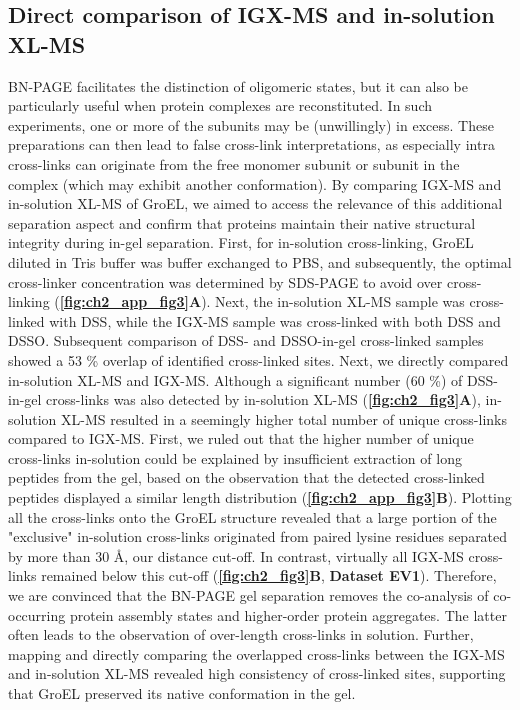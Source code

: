 \subsection*{Direct comparison of IGX-MS and in-solution XL-MS}
BN-PAGE facilitates the distinction of oligomeric states, but it can also be particularly useful when protein complexes are reconstituted. In such experiments, one or more of the subunits may be (unwillingly) in excess. These preparations can then lead to false cross-link interpretations, as especially intra cross-links can originate from the free monomer subunit or subunit in the complex (which may exhibit another conformation). By comparing IGX-MS and in-solution XL-MS of GroEL, we aimed to access the relevance of this additional separation aspect and confirm that proteins maintain their native structural integrity during in-gel separation. First, for in-solution cross-linking, GroEL diluted in Tris buffer was buffer exchanged to PBS, and subsequently, the optimal cross-linker concentration was determined by SDS-PAGE to avoid over cross-linking (\textbf{\autoref{fig:ch2_app_fig3}A}). Next, the in-solution XL-MS sample was cross-linked with DSS, while the IGX-MS sample was cross-linked with both DSS and DSSO. Subsequent comparison of DSS- and DSSO-in-gel cross-linked samples showed a 53 \% overlap of identified cross-linked sites. Next, we directly compared in-solution XL-MS and IGX-MS. Although a significant number (60 \%) of DSS-in-gel cross-links was also detected by in-solution XL-MS (\textbf{\autoref{fig:ch2_fig3}A}), in-solution XL-MS resulted in a seemingly higher total number of unique cross-links compared to IGX-MS. First, we ruled out that the higher number of unique cross-links in-solution could be explained by insufficient extraction of long peptides from the gel, based on the observation that the detected cross-linked peptides displayed a similar length distribution (\textbf{\autoref{fig:ch2_app_fig3}B}). Plotting all the cross-links onto the GroEL structure revealed that a large portion of the "exclusive" in-solution cross-links originated from paired lysine residues separated by more than 30 Å, our distance cut-off. In contrast, virtually all IGX-MS cross-links remained below this cut-off (\textbf{\autoref{fig:ch2_fig3}B}, \textbf{Dataset EV1}). Therefore, we are convinced that the BN-PAGE gel separation removes the co-analysis of co-occurring protein assembly states and higher-order protein aggregates. The latter often leads to the observation of over-length cross-links in solution. Further, mapping and directly comparing the overlapped cross-links between the IGX-MS and in-solution XL-MS revealed high consistency of cross-linked sites, supporting that GroEL preserved its native conformation in the gel.

